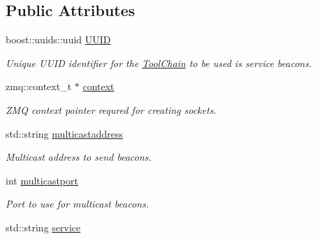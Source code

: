 \subsection*{Public Attributes}
\begin{DoxyCompactItemize}
\item 
\hypertarget{structthread__args_a707586ba05cc2c8be29cf22769b67634}{boost\-::uuids\-::uuid \hyperlink{structthread__args_a707586ba05cc2c8be29cf22769b67634}{U\-U\-I\-D}}\label{structthread__args_a707586ba05cc2c8be29cf22769b67634}

\begin{DoxyCompactList}\small\item\em Unique U\-U\-I\-D identifier for the \hyperlink{classToolChain}{Tool\-Chain} to be used is service beacons. \end{DoxyCompactList}\item 
\hypertarget{structthread__args_a9ff7c18d701d18b1f43f30116c448d8e}{zmq\-::context\-\_\-t $\ast$ \hyperlink{structthread__args_a9ff7c18d701d18b1f43f30116c448d8e}{context}}\label{structthread__args_a9ff7c18d701d18b1f43f30116c448d8e}

\begin{DoxyCompactList}\small\item\em Z\-M\-Q context pointer requred for creating sockets. \end{DoxyCompactList}\item 
\hypertarget{structthread__args_a15f6bcc7a120e51d1074bb8703322ed5}{std\-::string \hyperlink{structthread__args_a15f6bcc7a120e51d1074bb8703322ed5}{multicastaddress}}\label{structthread__args_a15f6bcc7a120e51d1074bb8703322ed5}

\begin{DoxyCompactList}\small\item\em Multicast address to send beacons. \end{DoxyCompactList}\item 
\hypertarget{structthread__args_aa6059ab0eeca3f487491f2542bb5120b}{int \hyperlink{structthread__args_aa6059ab0eeca3f487491f2542bb5120b}{multicastport}}\label{structthread__args_aa6059ab0eeca3f487491f2542bb5120b}

\begin{DoxyCompactList}\small\item\em Port to use for multicast beacons. \end{DoxyCompactList}\item 
\hypertarget{structthread__args_a92798a7f2094db41f45ecbef0c067ca9}{std\-::string \hyperlink{structthread__args_a92798a7f2094db41f45ecbef0c067ca9}{service}}\label{structthread__args_a92798a7f2094db41f45ecbef0c067ca9}


\end{DoxyCompactItemize}
